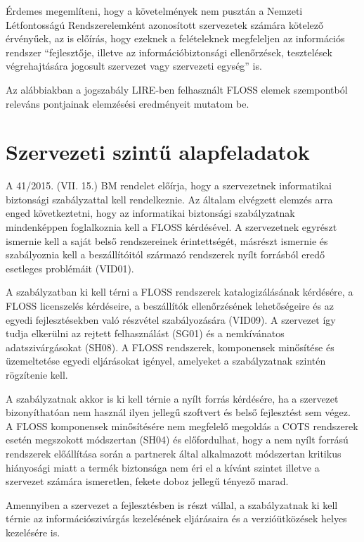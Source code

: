 \documentclass[12pt,magyar,a4paper,oneside]{scrreprt}
\begin{document}
Érdemes megemlíteni, hogy a követelmények nem pusztán a Nemzeti
Létfontosságú Rendszerelemként azonosított szervezetek számára kötelező
érvényűek, az is előírás, hogy ezeknek a felételeknek megfeleljen az
információs rendszer ``fejlesztője, illetve az információbiztonsági
ellenőrzések, tesztelések végrehajtására jogosult szervezet vagy
szervezeti egység'' is.

Az alábbiakban a jogszabály LIRE-ben felhasznált FLOSS elemek
szempontból releváns pontjainak elemzésési eredményeit mutatom be.

\hypertarget{szervezeti-szintux171-alapfeladatok}{%
\section{Szervezeti szintű
alapfeladatok}\label{szervezeti-szintux171-alapfeladatok}}

A 41/2015. (VII. 15.) BM rendelet előírja, hogy a szervezetnek
informatikai biztonsági szabályzattal kell rendelkeznie. Az általam
elvégzett elemzés arra enged következtetni, hogy az informatikai
biztonsági szabályzatnak mindenképpen foglalkoznia kell a FLOSS
kérdésével. A szervezetnek egyrészt ismernie kell a saját belső
rendszereinek érintettségét, másrészt ismernie és szabályoznia kell a
beszállítóitól származó rendszerek nyílt forrásból eredő esetleges
problémáit (VID01).

A szabályzatban ki kell térni a FLOSS rendszerek katalogizálásának
kérdésére, a FLOSS licenszelés kérdéseire, a beszállítók ellenőrzésének
lehetőségeire és az egyedi fejlesztésekben való részvétel szabályozására
(VID09). A szervezet így tudja elkerülni az rejtett felhasználást (SG01)
és a nemkívánatos adatszivárgásokat (SH08). A FLOSS rendszerek,
komponensek minősítése és üzemeltetése egyedi eljárásokat igényel,
amelyeket a szabályzatnak szintén rögzítenie kell.

A szabályzatnak akkor is ki kell térnie a nyílt forrás kérdésére, ha a
szervezet bizonyíthatóan nem használ ilyen jellegű szoftvert és belső
fejlesztést sem végez. A FLOSS komponensek minősítésére nem megfelelő
megoldás a COTS rendszerek esetén megszokott módszertan (SH04) és
előfordulhat, hogy a nem nyílt forrású rendszerek előállítása során a
partnerek által alkalmazott módszertan kritikus hiányosági miatt a
termék biztonsága nem éri el a kívánt szintet illetve a szervezet
számára ismeretlen, fekete doboz jellegű tényező marad.

Amennyiben a szervezet a fejlesztésben is részt vállal, a szabályzatnak
ki kell térnie az információszivárgás kezelésének eljárásaira és a
verzióütközések helyes kezelésére is.
\end{document}
